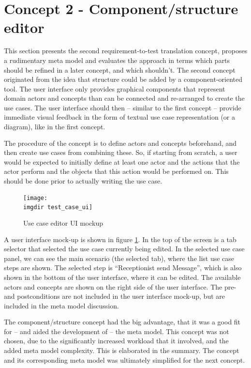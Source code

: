 \section{Concept 2 - Component/structure editor}
This section presents the second requirement-to-test translation concept, proposes a rudimentary meta model and evaluates the approach in terms which parts should be refined in a later concept, and which shouldn't.
The second concept originated from the idea that structure could be added by a component-oriented tool. The user interface only provides graphical components that represent domain actors and concepts than can be connected and re-arranged to create the use cases. The user interface should then -- similar to the first concept -- provide immediate visual feedback in the form of textual use case representation (or a diagram), like in the first concept.\medskip

\noindent The procedure of the concept is to define actors and concepts beforehand, and then create use cases from combining these. So, if starting from scratch, a user would be expected to initially define at least one actor and the actions that the actor perform and the objects that this action would be performed on. This should be done prior to actually writing the use case.\medskip
\begin{figure}[!htbp]
\texttt{[image: \\imgdir test\_case\_ui]}
\centering
\caption{Use case editor UI mockup}
\label{fig:use_case_editor_mockup}
\end{figure}

\noindent A user interface mock-up is shown in figure \ref{fig:use_case_editor_mockup}. In the top of the screen is a tab selector that selected the use case currently being edited. In the selected use case panel, we can see the main scenario (the selected tab), where the list use case steps are shown. The selected step is ``Receptionist send Message'', which is also shown in the bottom of the user interface, where it can be edited. The available actors and concepts are shown on the right side of the user interface. The pre- and postconditions are not included in the user interface mock-up, but are included in the meta model discussion.\medskip

\noindent The component/structure concept had the big advantage, that it was a good fit for -- and aided the development of -- the meta model. This concept was not chosen, due to the significantly increased workload that it involved, and the added meta model complexity. This is elaborated in the summary. The concept and its corresponding meta model was ultimately simplified for the next concept.

